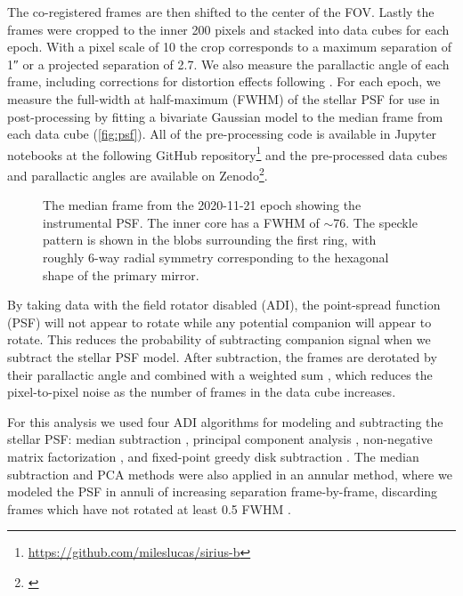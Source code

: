 \documentclass[twocolumn]{aastex631}
\begin{document}
The co-registered frames are then shifted to the center of the FOV. Lastly the frames were cropped to the inner 200 pixels and stacked into data cubes for each epoch. With a pixel scale of \qty{10}{\milliarcsecond} the crop corresponds to a maximum separation of \ang{;;1} or a projected separation of \qty{2.7}{\au}. We also measure the parallactic angle of each frame, including corrections for distortion effects following \citet{yelda_improving_2010}. For each epoch, we measure the full-width at half-maximum (FWHM) of the stellar PSF for use in post-processing by fitting a bivariate Gaussian model to the median frame from each data cube (\autoref{fig:psf}). All of the pre-processing code is available in Jupyter notebooks at the following GitHub repository\footnote{\href{https://github.com/mileslucas/sirius-b}{https://github.com/mileslucas/sirius-b}} and the pre-processed data cubes and parallactic angles are available on Zenodo\footnote{\citealt{lucas_nirc2_2021}}.

\begin{figure}
    \centering
    \caption{The median frame from the 2020-11-21 epoch showing the instrumental PSF. The inner core has a FWHM of $\sim$\qty{76}{\milliarcsecond}. The speckle pattern is shown in the blobs surrounding the first ring, with roughly 6-way radial symmetry corresponding to the hexagonal shape of the primary mirror.}
    \label{fig:psf}
\end{figure}

By taking data with the field rotator disabled (ADI), the point-spread function (PSF) will not appear to rotate while any potential companion will appear to rotate. This reduces the probability of subtracting companion signal when we subtract the stellar PSF model. After subtraction, the frames are derotated by their parallactic angle and combined with a weighted sum \citep{bottom_noise-weighted_2017}, which reduces the pixel-to-pixel noise as the number of frames in the data cube increases.

For this analysis we used four ADI algorithms for modeling and subtracting the stellar PSF: median subtraction \citep{marois_angular_2006}, principal component analysis \citep[PCA, also referred to as KLIP;][]{soummer_detection_2012}, non-negative matrix factorization \citep[NMF;][]{ren_non-negative_2018}, and fixed-point greedy disk subtraction \citep[GreeDS;][]{pairet_reference-less_2019,pairet_mayonnaise_2020}. The median subtraction and PCA methods were also applied in an annular method, where we modeled the PSF in annuli of increasing separation frame-by-frame, discarding frames which have not rotated at least 0.5 FWHM \citep{marois_angular_2006}.
\end{document}
